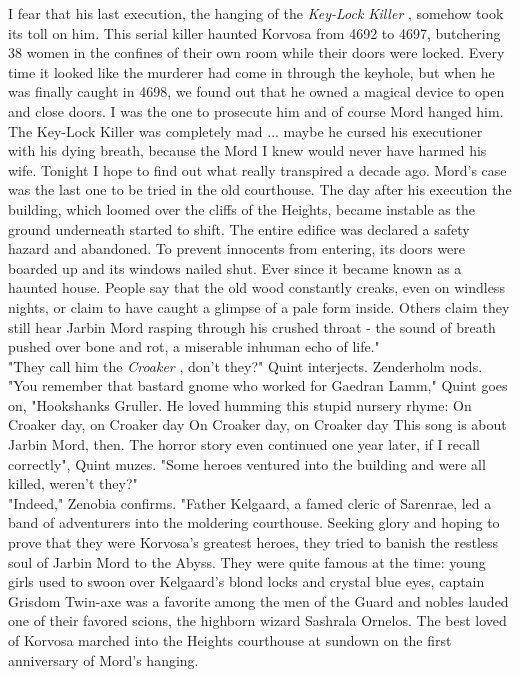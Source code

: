 I fear that his last execution, the hanging of the {\itshape Key-Lock Killer} , somehow took its toll on him. This serial killer haunted Korvosa from 4692 to 4697, butchering 38 women in the confines of their own room while their doors were locked. Every time it looked like the murderer had come in through the keyhole, but when he was finally caught in 4698, we found out that he owned a magical device to open and close doors. I was the one to prosecute him and of course Mord hanged him. The Key-Lock Killer was completely mad ... maybe he cursed his executioner with his dying breath, because the Mord I knew would never have harmed his wife. Tonight I hope to find out what really transpired a decade ago. Mord's case was the last one to be tried in the old courthouse. The day after his execution the building, which loomed over the cliffs of the Heights, became instable as the ground underneath started to shift. The entire edifice was declared a safety hazard and abandoned. To prevent innocents from entering, its doors were boarded up and its windows nailed shut. Ever since it became known as a haunted house. People say that the old wood constantly creaks, even on windless nights, or claim to have caught a glimpse of a pale form inside. Others claim they still hear Jarbin Mord rasping through his crushed throat - the sound of breath pushed over bone and rot, a miserable inhuman echo of life."\\

"They call him the {\itshape Croaker} , don't they?" Quint interjects. Zenderholm nods. "You remember that bastard gnome who worked for Gaedran Lamm," Quint goes on, "Hookshanks Gruller. He loved humming this stupid nursery rhyme: On Croaker day, on Croaker day   On Croaker day, on Croaker day   This song is about Jarbin Mord, then. The horror story even continued one year later, if I recall correctly", Quint muzes. "Some heroes ventured into the building and were all killed, weren't they?"\\

"Indeed," Zenobia confirms. "Father Kelgaard, a famed cleric of Sarenrae, led a band of adventurers into the moldering courthouse. Seeking glory and hoping to prove that they were Korvosa's greatest heroes, they tried to banish the restless soul of Jarbin Mord to the Abyss. They were quite famous at the time: young girls used to swoon over Kelgaard's blond locks and crystal blue eyes, captain Grisdom Twin-axe was a favorite among the men of the Guard and nobles lauded one of their favored scions, the highborn wizard Sashrala Ornelos. The best loved of Korvosa marched into the Heights courthouse at sundown on the first anniversary of Mord's hanging.\\

